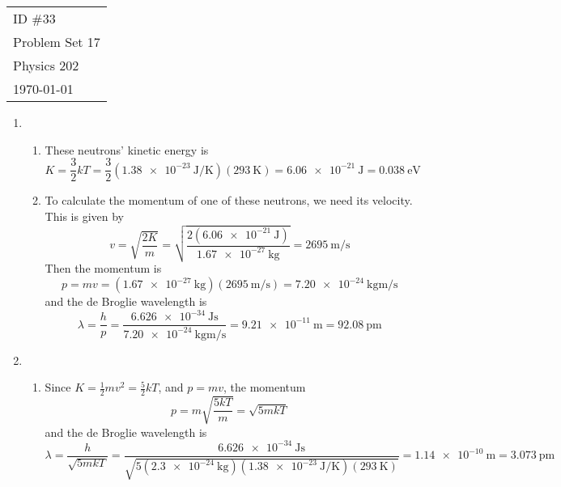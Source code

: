 \documentclass[fleqn]{article}[12pt]
\begin{document}
    \begin{tabular}{l}
        ID \#33 \\
        Problem Set 17 \\
        Physics 202 \\
        \today
    \end{tabular}

\begin{enumerate}
    \item \begin{enumerate}
        \item These neutrons' kinetic energy is
        \begin{equation*}
            K = \frac{3}{2}kT = \frac{3}{2} (\SI{1.38e-23}{\joule/\kelvin})(\SI{293}{\kelvin}) = \SI{6.06e-21}{\joule} = \SI{0.038}{\eV}
        \end{equation*}

        \item To calculate the momentum of one of these neutrons, we need its velocity. This is given by
        \begin{equation*}
            v = \sqrt{\frac{2K}{m}} = \sqrt{\frac{2(\SI{6.06e-21}{\joule})}{\SI{1.67e-27}{\kg}}} = \SI{2695}{\m/\s}
        \end{equation*}
        Then the momentum is
        \begin{equation}
            p = mv = (\SI{1.67e-27}{\kg})(\SI{2695}{\m/\s}) = \SI{7.20e-24}{\kg\m/\s}
        \end{equation}
        and the de Broglie wavelength is
        \begin{equation*}
            \lambda = \frac{h}{p} = \frac{\SI{6.626e-34}{\joule\s}}{\SI{7.20e-24}{\kg\m/\s}} = \SI{9.21e-11}{\meter} = \SI{92.08}{\pico\meter}
        \end{equation*}
    \end{enumerate}

    \item \begin{enumerate}
        \item Since $K = \frac{1}{2}mv^2 = \frac{5}{2} k T$, and $p = mv$, the momentum
        \begin{equation*}
            p = m\sqrt{\frac{5 k T}{m}} = \sqrt{5 m k T}
        \end{equation*}
        and the de Broglie wavelength is
        \begin{equation*}
            \lambda = \frac{h}{\sqrt{5 m k T}} = \frac{\SI{6.626e-34}{\joule\s}}{\sqrt{5 (\SI{2.3e-24}{\kg})(\SI{1.38e-23}{\joule/\kelvin})(\SI{293}{\kelvin})}} = \SI{1.14e-10}{\meter} = \SI{3.073}{\pico\meter}
        \end{equation*}


\end{enumerate}
\end{enumerate}
\end{document}
